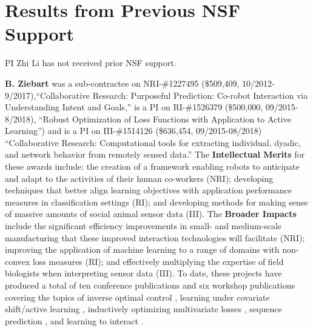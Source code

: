 \documentclass[letterpaper, 11 pt, onecolumn]{article}
\begin{document}

\section{Results from Previous NSF Support}\label{sec:priorNSF}

PI Zhi Li has not received prior NSF support.

\textbf{B. Ziebart} was a sub-contractee on NRI-\#1227495 (\$509,409,
10/2012-9/2017),``Collaborative Research:
Purposeful Prediction: Co-robot Interaction via Understanding Intent
and Goals,'' is a PI on RI-\#1526379 (\$500,000, 09/2015-8/2018),
``Robust Optimization of Loss Functions with Application to
Active Learning'') and is a PI on III-\#1514126 (\$636,454, 09/2015-08/2018)
``Collaborative Research: Computational tools for extracting individual,
dyadic, and network behavior from remotely sensed data.''
The {\bf Intellectual Merits} for these awards include: the
creation of a framework enabling robots to anticipate and adapt to the
activities of their human co-workers (NRI); developing techniques that
better align learning objectives with application performance measures
in classification settings (RI);
and developing methods for making sense of massive amounts of social animal
sensor data (III).
The {\bf Broader Impacts}
include the significant efficiency improvements in small- and
medium-scale manufacturing that these improved interaction technologies
will facilitate (NRI); improving the application of machine learning to a
range of domains with non-convex loss measures
(RI); and effectively multiplying the expertise
of field biologists when interpreting sensor data (III).
To date, these projects have produced
a total of ten conference publications and six workshop publications
covering the topics of
inverse optimal control \cite{asif2013inferring,monfort2013predictive,
byravan2014layered,monfort2015intent,chen2015predictive,
byravan2015graph,monfort2015softstar,chen2015imitation,chen2016adversarial},
learning under covariate shift/active learning
\cite{liu2014robust,liu2015shift,liu2015addressing,chen2016robust},
inductively optimizing multivariate losses \cite{wang2015adversarial},
sequence prediction \cite{li2016adversarial}, and learning to interact
\cite{behpour2015minimax}.
\end{document}
